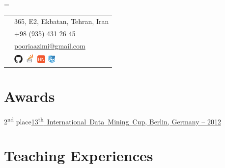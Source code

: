 \documentclass{tccv}
\begin{document}
{{\needspace{0.5\textheight}%
    \newdimen\boxwidth%
    \boxwidth=\dimexpr{}\fboxsep\relax%
    \colorbox[HTML]{BEDBE3}{%
    \begin{tabularx}{\boxwidth}{c|X}
	    \Writinghand & 
	    {365, E2, Ekbatan, Tehran, Iran}\smallskip\\
	    \Telefon     & 
	    {+98 (935) 431 26 45}\smallskip\\
	    \Letter      & 
	    \href{mailto:pooriaazimi@gmail.com}{pooriaazimi@gmail.com}
	    \\[3pt]
	     & 
		\href{https://github.com/pooriaazimi/}{\includegraphics[width=13pt]{Logos/Github.pdf}}
		\href{http://stackoverflow.com/users/347353/pooria-azimi}{\includegraphics[width=15pt]{Logos/StackOverflow.pdf}}
		\href{https://news.ycombinator.com/user?id=pooriaazimi}{\includegraphics[width=12pt]{Logos/HN.pdf}}
		\href{http://forum.irmug.com}{\includegraphics[width=13pt]{Logos/IRMUG.pdf}}
	\end{tabularx}}
	





\vspace{8pt}





\section{Awards}

\begin{factlist}
	
	\item{2\textsuperscript{nd} place}{\href{http://www.data-mining-cup.de/en/review/dmc-2012/}{\mbox{13\textsuperscript{th} International Data Mining Cup}, Berlin, Germany -- 2012}}

\end{factlist}






\section{Teaching Experiences}

}}
\end{document}
